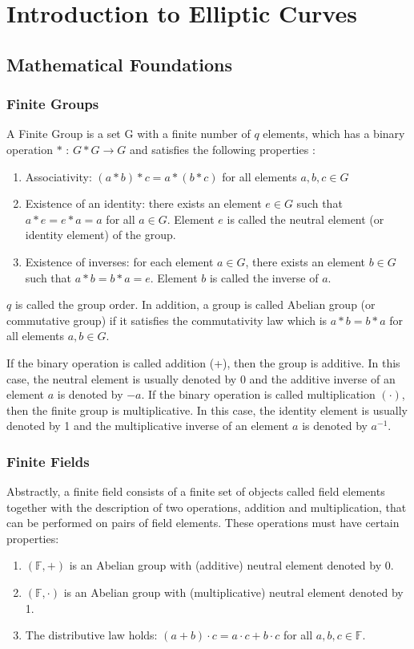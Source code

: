 \chapter{Introduction to Elliptic Curves} \label{Ch:EllipticCurve}
\section{Mathematical Foundations}
\subsection*{Finite Groups}
A Finite Group is a set G with a finite number of $q$ elements, which has a binary operation $*$ : $G * G \rightarrow G$ and satisfies the following properties \cite{hankerson2006guide}:
\begin{enumerate}
	\item Associativity: $(a*b)*c=a*(b*c)$ for all elements $a,b,c \in G$
	\item Existence of an identity: there exists an element $e \in G$ such that $a*e=e*a=a$ for all $a \in G$. Element $e$ is called the neutral element (or identity element) of the group.
	\item Existence of inverses: for each element $a \in G$, there exists an element $b \in G$ such that $a*b=b*a=e$. Element $b$ is called the inverse of $a$.
\end{enumerate}
$q$ is called the group order. In addition, a group is called Abelian group (or commutative group) if it satisfies the commutativity law which is $a*b=b*a$ for all elements $a,b \in G$. 

If the binary operation is called addition (+), then the group is additive. In this case, the neutral element is usually denoted by 0 and the additive inverse of an element $a$ is denoted by $-a$. If the binary operation is called multiplication $(\cdot)$, then the finite group is multiplicative. In this case, the identity element is usually denoted by 1 and the multiplicative inverse of an element $a$ is denoted by $a^{-1}$.

\subsection*{Finite Fields}
Abstractly, a finite field consists of a finite set of objects called field elements together with the description of two operations, addition and multiplication, that can be performed on pairs of field elements. These operations must have certain properties: \cite{hankerson2006guide}
\begin{enumerate}
	\item $(\mathbb{F},+)$ is an Abelian group with (additive) neutral element denoted by 0.
	\item $(\mathbb{F},\cdot)$ is an Abelian group with (multiplicative) neutral element denoted by 1.
	\item The distributive law holds: $(a+b) \cdot c = a \cdot c + b \cdot c$ for all $a,b,c \in \mathbb{F}$. 
\end{enumerate}

